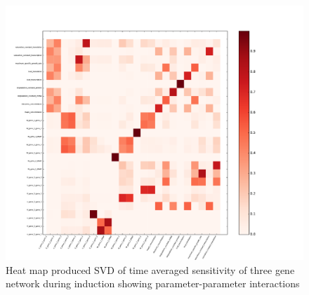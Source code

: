 \documentclass{article}
\begin{document}
\begin{figure}[!htb]
\includegraphics[width=12cm]{../ThreeGeneRachelV2/figures/ParameterInteractionsFrom10to70}
\caption{Heat map produced SVD of time averaged sensitivity of three gene network during induction showing parameter-parameter interactions}
\end{figure}
\end{document}
